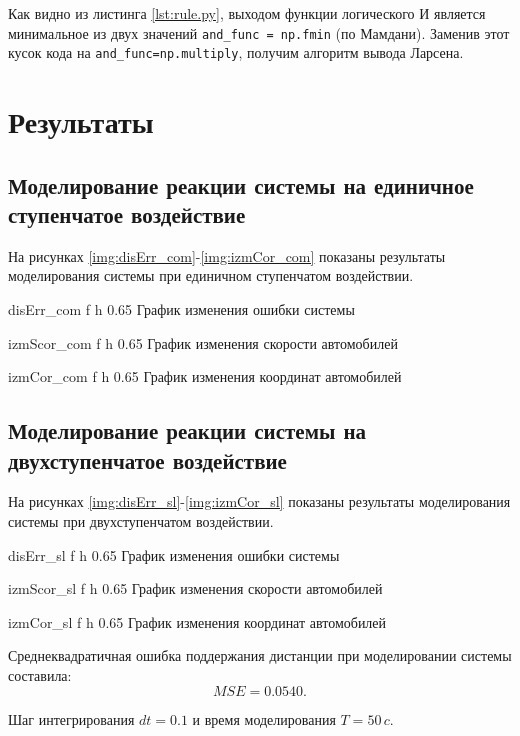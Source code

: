 Как видно из листинга \ref{lst:rule.py}, выходом функции логического И является 
минимальное из двух значений \lstinline|and_func = np.fmin| (по Мамдани).
Заменив этот кусок кода на \lstinline|and_func=np.multiply|, получим алгоритм вывода
Ларсена.

\section{Результаты}

\subsection{Моделирование реакции системы на единичное ступенчатое
 воздействие}

На рисунках \ref{img:disErr_com}-\ref{img:izmCor_com} показаны результаты
 моделирования системы при единичном ступенчатом воздействии.

        {disErr_com}
        {f}
        {h}
        {0.65\textwidth}
        {График изменения ошибки системы}

        {izmScor_com}
        {f}
        {h}
        {0.65\textwidth}
        {График изменения скорости автомобилей}

        
        {izmCor_com}
        {f}
        {h}
        {0.65\textwidth}
        {График изменения координат автомобилей}

\newpage

\subsection{Моделирование реакции системы на двухступенчатое воздействие}

На рисунках \ref{img:disErr_sl}-\ref{img:izmCor_sl} показаны результаты
 моделирования системы при двухступенчатом воздействии.

        {disErr_sl}
        {f}
        {h}
        {0.65\textwidth}
        {График изменения ошибки системы}

        {izmScor_sl}
        {f}
        {h}
        {0.65\textwidth}
        {График изменения скорости автомобилей}

        {izmCor_sl}
        {f}
        {h}
        {0.65\textwidth}
        {График изменения координат автомобилей}

\newpage

Среднеквадратичная ошибка поддержания дистанции при моделировании системы составила:
\[
MSE = 0.0540.
\]

Шаг интегрирования \( dt = 0.1 \) и время моделирования \( T = 50 \, c \).

